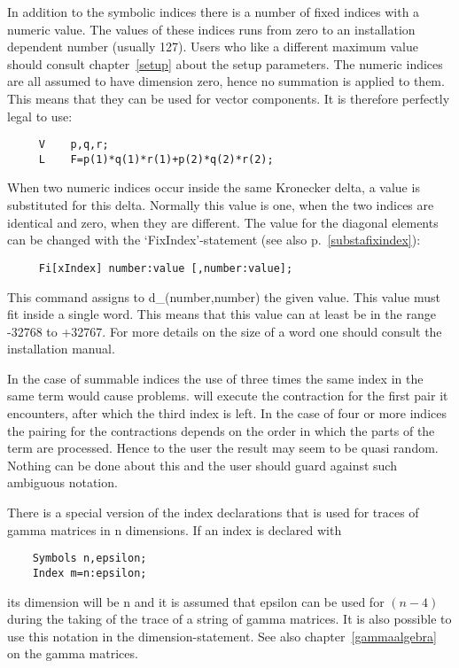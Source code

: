 In addition to the symbolic indices there is a number of fixed 
indices with a numeric value. 
The values of these indices runs from zero to an installation dependent 
number (usually 127). Users who like a different maximum value should 
consult chapter~\ref{setup} about the setup parameters. The numeric indices 
are all assumed to have dimension zero, hence no summation is applied to 
them. This means that they can be used for vector components. It is 
therefore perfectly legal to use:
\begin{verbatim}
     V    p,q,r;
     L    F=p(1)*q(1)*r(1)+p(2)*q(2)*r(2);
\end{verbatim}
When two numeric indices occur inside the same Kronecker delta, a value 
is substituted for this delta. Normally this value is one, when the two 
indices are identical and zero, when they are different. The value for 
the diagonal elements can be changed with the 
`FixIndex'-statement (see also p.~\ref{substafixindex}): 
\begin{verbatim}
     Fi[xIndex] number:value [,number:value];
\end{verbatim}
This command assigns to d\_(number,number) the given value. 
This value must fit inside a single {\FORM} word. This means that this 
value can at least be in the range -32768 to +32767. For more 
details on the size of a {\FORM} word one should consult the 
installation manual. 

In the case of summable indices the use of three 
times the same index in the same term would cause problems. {\FORM} will 
execute the contraction for the first pair it encounters, after which the 
third index is left. In the case of four or more indices the pairing for 
the contractions depends on the order in which the parts of the term are 
processed. Hence to the user the result may seem to be quasi random. 
Nothing can be done about this and the user should guard against such 
ambiguous notation.

There is a special version of the index declarations that is used for 
traces of gamma 
matrices in n dimensions. If an index is declared with
\begin{verbatim}
    Symbols n,epsilon;
    Index m=n:epsilon;
\end{verbatim}
its dimension will be n and it is assumed that epsilon can be used for 
$(n-4)$ during the taking of the trace of a string of gamma matrices. It 
is also possible to use this notation in the dimension-statement. See 
also chapter~\ref{gammaalgebra} on the gamma matrices.


